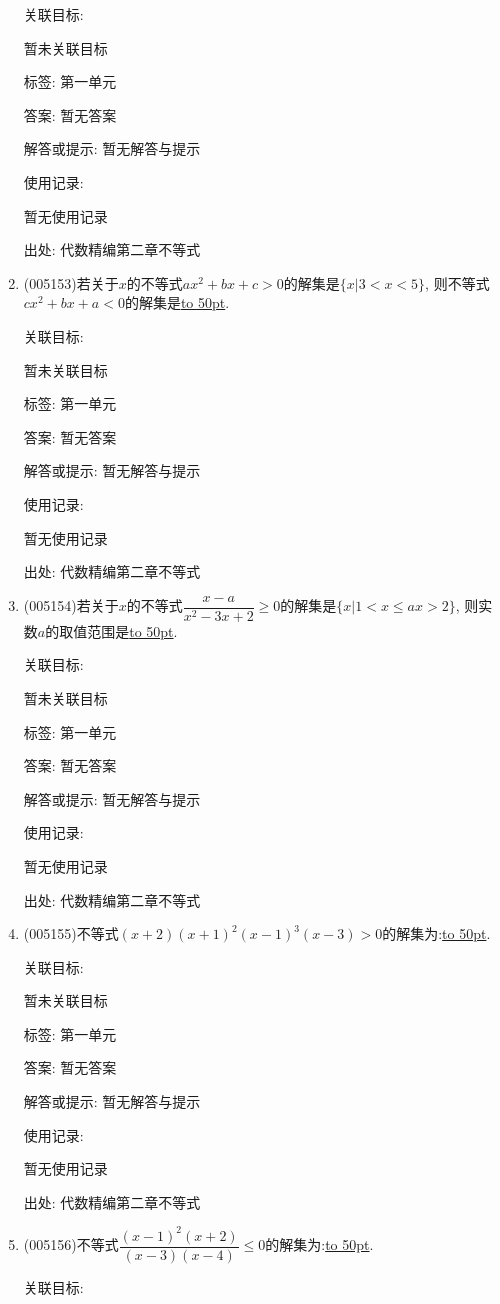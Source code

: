 \documentclass[10pt,a4paper]{article}
\newcommand{\blank}[1]{\underline{\hbox to #1pt{}}}
\begin{document}
\begin{enumerate}[1.]
关联目标:

暂未关联目标



标签: 第一单元

答案: 暂无答案

解答或提示: 暂无解答与提示

使用记录:

暂无使用记录


出处: 代数精编第二章不等式
\item { (005153)}若关于$x$的不等式$ax^2+bx+c>0$的解集是$\{x|3<x<5\}$, 则不等式$cx^2+bx+a<0$的解集是\blank{50}.


关联目标:

暂未关联目标



标签: 第一单元

答案: 暂无答案

解答或提示: 暂无解答与提示

使用记录:

暂无使用记录


出处: 代数精编第二章不等式
\item { (005154)}若关于$x$的不等式$\dfrac{x-a}{x^2-3x+2}\ge 0$的解集是$\{x|1<x\le ax>2\}$, 则实数$a$的取值范围是\blank{50}.


关联目标:

暂未关联目标



标签: 第一单元

答案: 暂无答案

解答或提示: 暂无解答与提示

使用记录:

暂无使用记录


出处: 代数精编第二章不等式
\item { (005155)}不等式$(x+2)(x+1)^2(x-1)^3(x-3)>0$的解集为:\blank{50}.


关联目标:

暂未关联目标



标签: 第一单元

答案: 暂无答案

解答或提示: 暂无解答与提示

使用记录:

暂无使用记录


出处: 代数精编第二章不等式
\item { (005156)}不等式$\dfrac{(x-1)^2(x+2)}{(x-3)(x-4)}\le 0$的解集为:\blank{50}.


关联目标:


\end{enumerate}
\end{document}
